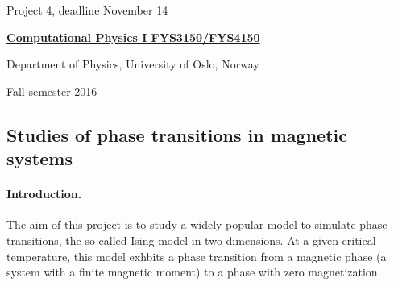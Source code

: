 \documentclass[%
oneside,                 %
final,                   %
10pt]{article}
\begin{document}

\newcommand{\exercisesection}[1]{\subsection*{#1}}






\thispagestyle{empty}

\begin{center}
{\LARGE\bf
\begin{spacing}{1.25}
Project 4, deadline  November 14
\end{spacing}
}
\end{center}


\begin{center}
{\bf \href{{http://www.uio.no/studier/emner/matnat/fys/FYS3150/index-eng.html}}{Computational Physics I FYS3150/FYS4150}}
\end{center}

    \begin{center}
\centerline{{\small Department of Physics, University of Oslo, Norway}}
\end{center}
    

\begin{center}
Fall semester 2016
\end{center}

\vspace{1cm}


\subsection{Studies of phase transitions in magnetic systems}

\paragraph{Introduction.}
The aim of this project is to study a widely popular model to simulate phase transitions, the so-called Ising model in two dimensions. At a given critical temperature, this model exhbits a phase transition from a magnetic phase (a system with a finite magnetic moment) to a phase with zero magnetization. 
\end{document}
